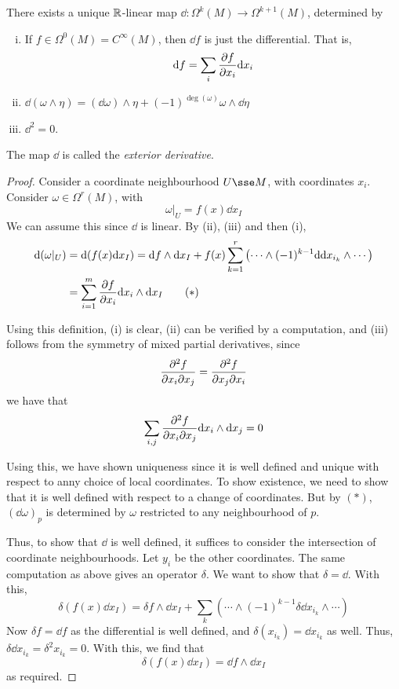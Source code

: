 \documentclass{article}
\begin{document}
\lec


\begin{theorem}
    There exists a unique \(\mathbb{R}\)-linear map \(\dd : \Omega^k(M) \to \Omega^{k+1}(M)\), determined by
    \begin{enumerate}[(i)]
        \item If \(f \in \Omega^0(M) = C^\infty(M)\), then \(\dd f\) is just the differential. That is,
        \[\dd f = \sum_i \pdv{f}{x_i}\dd x_i\]
        \item \(\dd(\omega \wedge \eta) = (\dd\omega)\wedge \eta + (-1)^{\deg(\omega)}\omega \wedge \dd\eta\)
        \item \(\dd^2 = 0\).
    \end{enumerate}
    The map \(\dd\) is called the \emph{exterior derivative}.
\end{theorem}

\begin{proof}
    Consider a coordinate neighbourhood \(U \sse M\), with coordinates \(x_i\). Consider \(\omega \in \Omega^r(M)\), with
    \[\omega\vert_U = f(x)\dd x_I\]
    We can assume this since \(\dd\) is linear. By (ii), (iii) and then (i),
    \begin{align*}
        \dd(\omega\vert_U) &= \dd(f(x)\dd x_I) = \dd f \wedge \dd x_I + f(x)\sum_{k=1}^r\left(\cdots \wedge (-1)^{k-1}\dd\dd x_{i_k} \wedge \cdots\right) \\
        &= \sum_{i=1}^m \pdv{f}{x_i}\dd x_i \wedge \dd x_I \tag{\(*\)}
    \end{align*}

    Using this definition, (i) is clear, (ii) can be verified by a computation, and (iii) follows from the symmetry of mixed partial derivatives, since
    \[\pdv[2]{f}{x_i}{x_j} = \pdv[2]{f}{x_j}{x_i}\]
    we have that
    \[\sum_{i, j}\pdv[2]{f}{x_i}{x_j}\dd x_i \wedge \dd x_j = 0\]

    Using this, we have shown uniqueness since it is well defined and unique with respect to anny choice of local coordinates. To show existence, we need to show that it is well defined with respect to a change of coordinates. But by \((*)\), \((\dd\omega)_p\) is determined by \(\omega\) restricted to any neighbourhood of \(p\).

    Thus, to show that \(\dd\) is well defined, it suffices to consider the intersection of coordinate neighbourhoods. Let \(y_i\) be the other coordinates. The same computation as above gives an operator \(\delta\). We want to show that \(\delta = \dd\). With this,
    \[\delta(f(x)\dd x_I) = \delta f \wedge \dd x_I + \sum_k\left(\cdots \wedge (-1)^{k-1}\delta\dd x_{i_k}\wedge \cdots\right)\]
    Now \(\delta f = \dd f\) as the differential is well defined, and \(\delta(x_{i_k}) = \dd x_{i_k}\) as well. Thus, \(\delta\dd x_{i_k} = \delta^2 x_{i_k} = 0\). With this, we find that
    \[\delta(f(x)\dd x_I) = \dd f \wedge \dd x_I\]
    as required.
\end{proof}
\end{document}
